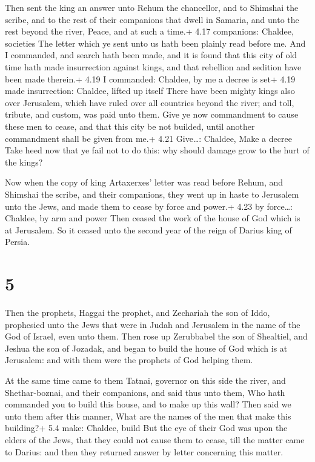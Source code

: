  Then sent the king an answer unto Rehum the chancellor,
and to Shimshai the scribe, and to the rest of their companions that
dwell in Samaria, and unto the rest beyond the river, Peace, and at such
a time.+ 4.17 companions: Chaldee, societies  The letter
which ye sent unto us hath been plainly read before me. 
And I commanded, and search hath been made, and it is found that this
city of old time hath made insurrection against kings, and that
rebellion and sedition have been made therein.+ 4.19 I commanded:
Chaldee, by me a decree is set+ 4.19 made insurrection: Chaldee, lifted
up itself  There have been mighty kings also over
Jerusalem, which have ruled over all countries beyond the river; and
toll, tribute, and custom, was paid unto them.  Give ye now
commandment to cause these men to cease, and that this city be not
builded, until another commandment shall be given from me.+ 4.21
Give\ldots: Chaldee, Make a decree  Take heed now that ye
fail not to do this: why should damage grow to the hurt of the kings?

 Now when the copy of king Artaxerxes' letter was read
before Rehum, and Shimshai the scribe, and their companions, they went
up in haste to Jerusalem unto the Jews, and made them to cease by force
and power.+ 4.23 by force\ldots: Chaldee, by arm and power 
Then ceased the work of the house of God which is at Jerusalem. So it
ceased unto the second year of the reign of Darius king of Persia.

\hypertarget{section-4}{%
\section{5}\label{section-4}}

 Then the prophets, Haggai the prophet, and Zechariah the
son of Iddo, prophesied unto the Jews that were in Judah and Jerusalem
in the name of the God of Israel, even unto them.  Then rose
up Zerubbabel the son of Shealtiel, and Jeshua the son of Jozadak, and
began to build the house of God which is at Jerusalem: and with them
were the prophets of God helping them.

 At the same time came to them Tatnai, governor on this
side the river, and Shethar-boznai, and their companions, and said thus
unto them, Who hath commanded you to build this house, and to make up
this wall?  Then said we unto them after this manner, What
are the names of the men that make this building?+ 5.4 make: Chaldee,
build  But the eye of their God was upon the elders of the
Jews, that they could not cause them to cease, till the matter came to
Darius: and then they returned answer by letter concerning this matter.

